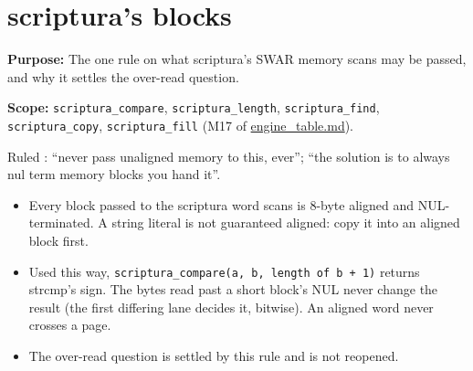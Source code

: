 \chapter{\texorpdfstring{scriptura's blocks}{scriptura's blocks}}
\label{chap:scriptura-blocks}

\textbf{Purpose:} The one rule on what scriptura's SWAR memory scans may be passed, and why it settles the over-read question.

\textbf{Scope:} \texttt{scriptura\_\allowbreak{}compare}, \texttt{scriptura\_\allowbreak{}length}, \texttt{scriptura\_\allowbreak{}find}, \texttt{scriptura\_\allowbreak{}copy}, \texttt{scriptura\_\allowbreak{}fill} (M17 of \hyperref[chap:engine-table]{engine\_\allowbreak{}table.md}).

Ruled : “never pass unaligned memory to this, ever”; “the solution is to always nul term memory blocks you hand it”.

\begin{itemize}
\item Every block passed to the scriptura word scans is 8-byte aligned and NUL-terminated. A string literal is not guaranteed aligned: copy it into an aligned block first.
\item Used this way, \texttt{scriptura\_\allowbreak{}compare(a, b, length of b + 1)} returns strcmp's sign. The bytes read past a short block's NUL never change the result (the first differing lane decides it, bitwise). An aligned word never crosses a page.
\item The over-read question is settled by this rule and is not reopened.
\end{itemize}
